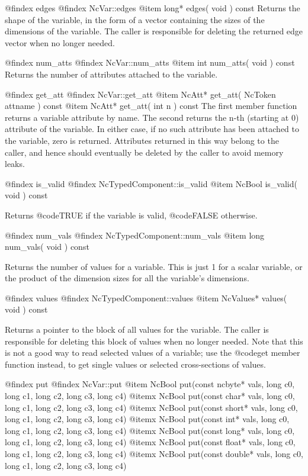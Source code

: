 @findex edges
@findex NcVar::edges
@item long* edges( void ) const
Returns the shape of the variable, in the form of a vector containing
the sizes of the dimensions of the variable.  The caller is responsible
for deleting the returned edge vector when no longer needed.

@findex num_atts
@findex NcVar::num_atts
@item int num_atts( void ) const
Returns the number of attributes attached to the variable.

@findex get_att
@findex NcVar::get_att
@item NcAtt* get_att( NcToken attname ) const
@item NcAtt* get_att( int n ) const
The first member function returns a variable attribute by name.  The
second returns the n-th (starting at 0) attribute of the variable.  In
either case, if no such attribute has been attached to the variable,
zero is returned.  Attributes returned in this way belong to the caller,
and hence should eventually be deleted by the caller to avoid memory
leaks.

@findex is_valid
@findex NcTypedComponent::is_valid
@item NcBool is_valid( void ) const

Returns @code{TRUE} if the variable is valid, @code{FALSE} otherwise.

@findex num_vals
@findex NcTypedComponent::num_vals
@item long num_vals( void ) const

Returns the number of values for a variable.  This is just 1 for a
scalar variable, or the product of the dimension sizes for all the
variable's dimensions.

@findex values
@findex NcTypedComponent::values
@item NcValues* values( void ) const

Returns a pointer to the block of all values for the variable.  
The caller is responsible for deleting this block of values
when no longer needed.
Note that this is not a good way to read selected values of
a variable; use the @code{get} member function instead, to get single
values or selected cross-sections of values.

@findex put
@findex NcVar::put
@item  NcBool put(const ncbyte* vals, long c0, long c1, long c2, long c3, long c4)
@itemx NcBool put(const char*   vals, long c0, long c1, long c2, long c3, long c4)
@itemx NcBool put(const short*  vals, long c0, long c1, long c2, long c3, long c4)
@itemx NcBool put(const int* vals, long c0, long c1, long c2, long c3, long c4)
@itemx NcBool put(const long* vals, long c0, long c1, long c2, long c3, long c4)
@itemx NcBool put(const float*  vals, long c0, long c1, long c2, long c3, long c4)
@itemx NcBool put(const double* vals, long c0, long c1, long c2, long c3, long c4)

